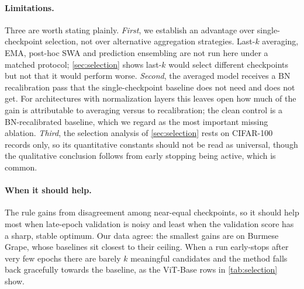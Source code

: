 \paragraph{Limitations.}
Three are worth stating plainly. \emph{First}, we establish an advantage over
single-checkpoint selection, not over alternative aggregation strategies.
Last-$k$ averaging, EMA, post-hoc SWA and prediction ensembling are not run
here under a matched protocol; \cref{sec:selection} shows last-$k$ would select
different checkpoints but not that it would perform worse. \emph{Second}, the
averaged model receives a BN recalibration pass that the single-checkpoint
baseline does not need and does not get. For architectures with normalization
layers this leaves open how much of the gain is attributable to averaging
versus to recalibration; the clean control is a BN-recalibrated baseline, which
we regard as the most important missing ablation. \emph{Third}, the selection
analysis of \cref{sec:selection} rests on CIFAR-100 records only, so its
quantitative constants should not be read as universal, though the qualitative
conclusion follows from early stopping being active, which is common.

\paragraph{When it should help.}
The rule gains from disagreement among near-equal checkpoints, so it should
help most when late-epoch validation is noisy and least when the validation
score has a sharp, stable optimum. Our data agree: the smallest gains are on
Burmese Grape, whose baselines sit closest to their ceiling. When a run
early-stops after very few epochs there are barely $k$ meaningful candidates
and the method falls back gracefully towards the baseline, as the ViT-Base rows
in \cref{tab:selection} show.
